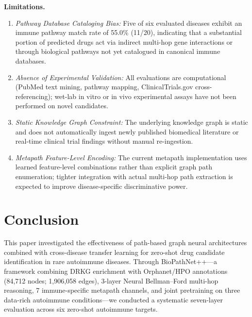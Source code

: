 \documentclass[conference]{IEEEtran}
\begin{document}
\textbf{Limitations.}
\begin{enumerate}
    \item \textit{Pathway Database Cataloging Bias:} Five of six evaluated diseases exhibit an immune pathway match rate of 55.0\% (11/20), indicating that a substantial portion of predicted drugs act via indirect multi-hop gene interactions or through biological pathways not yet catalogued in canonical immune databases.
    \item \textit{Absence of Experimental Validation:} All evaluations are computational (PubMed text mining, pathway mapping, ClinicalTrials.gov cross-referencing); wet-lab in vitro or in vivo experimental assays have not been performed on novel candidates.
    \item \textit{Static Knowledge Graph Constraint:} The underlying knowledge graph is static and does not automatically ingest newly published biomedical literature or real-time clinical trial findings without manual re-ingestion.
    \item \textit{Metapath Feature-Level Encoding:} The current metapath implementation uses learned feature-level combinations rather than explicit graph path enumeration; tighter integration with actual multi-hop path extraction is expected to improve disease-specific discriminative power.
\end{enumerate}

\section{Conclusion}

This paper investigated the effectiveness of path-based graph neural architectures combined with cross-disease transfer learning for zero-shot drug candidate identification in rare autoimmune diseases. Through BioPathNet++---a framework combining DRKG enrichment with Orphanet/HPO annotations (84,712 nodes; 1,906,058 edges), 3-layer Neural Bellman--Ford multi-hop reasoning, 7 immune-specific metapath channels, and joint pretraining on three data-rich autoimmune conditions---we conducted a systematic seven-layer evaluation across six zero-shot autoimmune targets.
\end{document}
